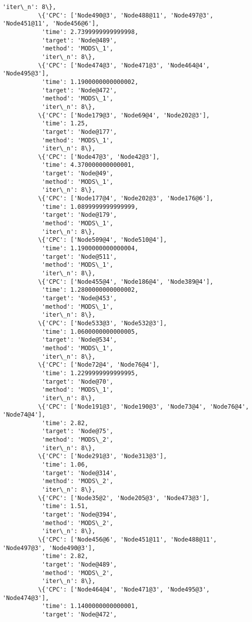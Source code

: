 \documentclass[11pt]{article}
\begin{document}
\begin{Verbatim}[commandchars=\\\{\}]
           'iter\_n': 8\},
          \{'CPC': ['Node490@3', 'Node488@11', 'Node497@3', 'Node451@11', 'Node456@6'],
           'time': 2.7399999999999998,
           'target': 'Node@489',
           'method': 'MODS\_1',
           'iter\_n': 8\},
          \{'CPC': ['Node474@3', 'Node471@3', 'Node464@4', 'Node495@3'],
           'time': 1.1900000000000002,
           'target': 'Node@472',
           'method': 'MODS\_1',
           'iter\_n': 8\},
          \{'CPC': ['Node179@3', 'Node69@4', 'Node202@3'],
           'time': 1.25,
           'target': 'Node@177',
           'method': 'MODS\_1',
           'iter\_n': 8\},
          \{'CPC': ['Node47@3', 'Node42@3'],
           'time': 4.370000000000001,
           'target': 'Node@49',
           'method': 'MODS\_1',
           'iter\_n': 8\},
          \{'CPC': ['Node177@4', 'Node202@3', 'Node176@6'],
           'time': 1.0899999999999999,
           'target': 'Node@179',
           'method': 'MODS\_1',
           'iter\_n': 8\},
          \{'CPC': ['Node509@4', 'Node510@4'],
           'time': 1.1900000000000004,
           'target': 'Node@511',
           'method': 'MODS\_1',
           'iter\_n': 8\},
          \{'CPC': ['Node455@4', 'Node186@4', 'Node389@4'],
           'time': 1.2800000000000002,
           'target': 'Node@453',
           'method': 'MODS\_1',
           'iter\_n': 8\},
          \{'CPC': ['Node533@3', 'Node532@3'],
           'time': 1.0600000000000005,
           'target': 'Node@534',
           'method': 'MODS\_1',
           'iter\_n': 8\},
          \{'CPC': ['Node72@4', 'Node76@4'],
           'time': 1.2299999999999995,
           'target': 'Node@70',
           'method': 'MODS\_1',
           'iter\_n': 8\},
          \{'CPC': ['Node191@3', 'Node190@3', 'Node73@4', 'Node76@4', 'Node74@4'],
           'time': 2.82,
           'target': 'Node@75',
           'method': 'MODS\_2',
           'iter\_n': 8\},
          \{'CPC': ['Node291@3', 'Node313@3'],
           'time': 1.06,
           'target': 'Node@314',
           'method': 'MODS\_2',
           'iter\_n': 8\},
          \{'CPC': ['Node35@2', 'Node205@3', 'Node473@3'],
           'time': 1.51,
           'target': 'Node@394',
           'method': 'MODS\_2',
           'iter\_n': 8\},
          \{'CPC': ['Node456@6', 'Node451@11', 'Node488@11', 'Node497@3', 'Node490@3'],
           'time': 2.82,
           'target': 'Node@489',
           'method': 'MODS\_2',
           'iter\_n': 8\},
          \{'CPC': ['Node464@4', 'Node471@3', 'Node495@3', 'Node474@3'],
           'time': 1.1400000000000001,
           'target': 'Node@472',

\end{Verbatim}
\end{document}
